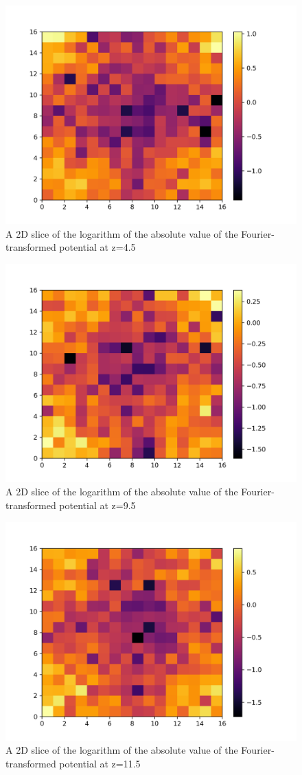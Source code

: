 \documentclass[a4paper,10pt]{article}
\begin{document}
\begin{figure}[H]
  \centering
  \includegraphics[width=.8\linewidth]{./plots/fourier_4.5.png}
  \caption{A 2D slice of the logarithm of the absolute value of the Fourier-transformed potential at z=4.5}
  \label{fig:four_4}
\end{figure}

\begin{figure}[H]
  \centering
  \includegraphics[width=.8\linewidth]{./plots/fourier_9.5.png}
  \caption{A 2D slice of the logarithm of the absolute value of the Fourier-transformed potential at z=9.5}
  \label{fig:four_9}
\end{figure}

\begin{figure}[H]
  \centering
  \includegraphics[width=.8\linewidth]{./plots/fourier_11.5.png}
  \caption{A 2D slice of the logarithm of the absolute value of the Fourier-transformed potential at z=11.5}
  \label{fig:four_11}
\end{figure}
\end{document}

